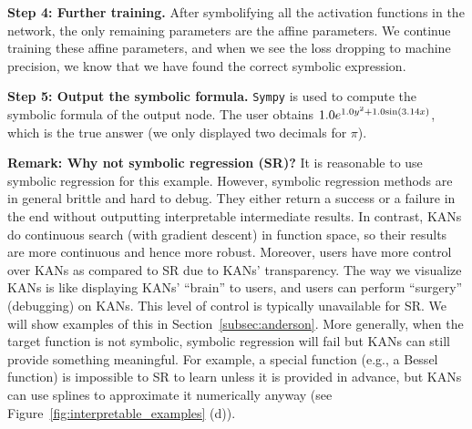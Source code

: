 \documentclass{article}
\numberwithin{equation}{section}
\numberwithin{figure}{section}
\begin{document}
{\bf Step 4: Further training.} %
After symbolifying all the activation functions in the network, the only remaining parameters are the affine parameters. We continue training these affine parameters, and when we see the loss dropping to machine precision, we know that we have found the correct symbolic expression. %

{\bf Step 5: Output the symbolic formula.} \texttt{Sympy} is used to compute the symbolic formula of the output node. The user obtains $1.0e^{1.0y^2+1.0{\rm sin}(3.14x)}$, which is the true answer (we only displayed two decimals for $\pi$).

{\bf Remark: Why not symbolic regression (SR)?} 
It is reasonable to use symbolic regression for this example. However, symbolic regression methods are in general brittle and hard to debug. They either return a success or a failure in the end without outputting interpretable intermediate results. In contrast, KANs do continuous search (with gradient descent) in function space, so their results are more continuous and hence more robust. Moreover, users have more control over KANs as compared to SR due to KANs' transparency. The way we visualize KANs is like displaying KANs' ``brain'' to users, and users can perform ``surgery'' (debugging) on KANs. This level of control is typically unavailable for SR. We will show examples of this in Section~\ref{subsec:anderson}. More generally, when the target function is not symbolic, symbolic regression will fail but KANs can still provide something meaningful. For example, a special function (e.g., a Bessel function) is impossible to SR to learn unless it is provided in advance, but KANs can use splines to approximate it numerically anyway (see Figure~\ref{fig:interpretable_examples} (d)).


\end{document}
